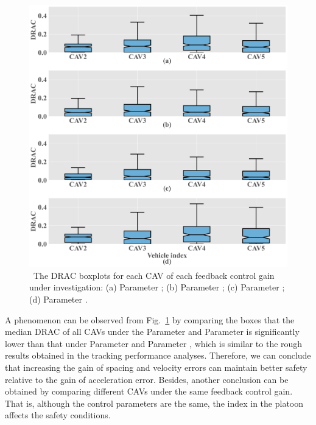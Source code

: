 \documentclass[a4paper]{cas-sc}
\begin{document}
\begin{figure}

  \centering
  \includegraphics[width=14cm]{figs/fig8.png}
  \caption{~The DRAC boxplots for each CAV of each feedback control gain under investigation: (a) Parameter \uppercase\expandafter{}; (b) Parameter \uppercase\expandafter{}; (c) Parameter \uppercase\expandafter{}; (d) Parameter \uppercase\expandafter{}.}
  \label{fig8}
\end{figure}



A phenomenon can be observed from Fig.~\ref{fig8} by comparing the boxes that the median DRAC of all CAVs under the Parameter \uppercase\expandafter{} and Parameter \uppercase\expandafter{} is significantly lower than that under Parameter \uppercase\expandafter{} and Parameter \uppercase\expandafter{}, which is similar to the rough results obtained in the tracking performance analyses. Therefore, we can conclude that increasing the gain of spacing and velocity errors can maintain better safety relative to the gain of acceleration error. Besides, another conclusion can be obtained by comparing different CAVs under the same feedback control gain. That is, although the control parameters are the same, the index in the platoon affects the safety conditions.
\end{document}
